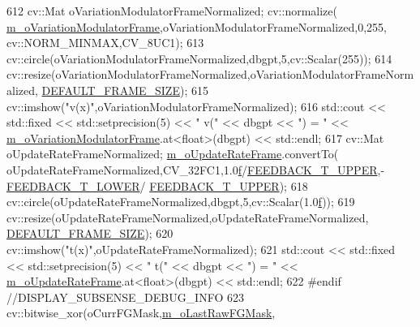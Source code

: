 \begin{DoxyCode}
612     cv::Mat oVariationModulatorFrameNormalized; cv::normalize(
      \mbox{\hyperlink{class_background_subtractor_su_b_s_e_n_s_e_a47d9cf067ac639d95fcb810c894bb770}{m\_oVariationModulatorFrame}},oVariationModulatorFrameNormalized,0,255,
      cv::NORM\_MINMAX,CV\_8UC1);
613     cv::circle(oVariationModulatorFrameNormalized,dbgpt,5,cv::Scalar(255));
614     cv::resize(oVariationModulatorFrameNormalized,oVariationModulatorFrameNormalized,
      \mbox{\hyperlink{_background_subtractor_su_b_s_e_n_s_e_8cpp_aee6405a4f74939fffcc9b3055af94b3a}{DEFAULT\_FRAME\_SIZE}});
615     cv::imshow(\textcolor{stringliteral}{"v(x)"},oVariationModulatorFrameNormalized);
616     std::cout << std::fixed << std::setprecision(5) << \textcolor{stringliteral}{"      v("} << dbgpt << \textcolor{stringliteral}{") = "} << 
      \mbox{\hyperlink{class_background_subtractor_su_b_s_e_n_s_e_a47d9cf067ac639d95fcb810c894bb770}{m\_oVariationModulatorFrame}}.at<\textcolor{keywordtype}{float}>(dbgpt) << std::endl;
617     cv::Mat oUpdateRateFrameNormalized; \mbox{\hyperlink{class_background_subtractor_su_b_s_e_n_s_e_a90cb2cc5cbe3f2f0b01e06f514c8b569}{m\_oUpdateRateFrame}}.convertTo(
      oUpdateRateFrameNormalized,CV\_32FC1,1.0\mbox{\hyperlink{rings_8cpp_a77369fc4d5326a16d2c603e032023528}{f}}/\mbox{\hyperlink{_background_subtractor_su_b_s_e_n_s_e_8cpp_a23bd980dc8c9bbffe3f27b44fa983f9c}{FEEDBACK\_T\_UPPER}},-\mbox{\hyperlink{_background_subtractor_su_b_s_e_n_s_e_8cpp_a6975332215c62c3172a76af852bc5566}{FEEDBACK\_T\_LOWER}}/
      \mbox{\hyperlink{_background_subtractor_su_b_s_e_n_s_e_8cpp_a23bd980dc8c9bbffe3f27b44fa983f9c}{FEEDBACK\_T\_UPPER}});
618     cv::circle(oUpdateRateFrameNormalized,dbgpt,5,cv::Scalar(1.0\mbox{\hyperlink{rings_8cpp_a77369fc4d5326a16d2c603e032023528}{f}}));
619     cv::resize(oUpdateRateFrameNormalized,oUpdateRateFrameNormalized,
      \mbox{\hyperlink{_background_subtractor_su_b_s_e_n_s_e_8cpp_aee6405a4f74939fffcc9b3055af94b3a}{DEFAULT\_FRAME\_SIZE}});
620     cv::imshow(\textcolor{stringliteral}{"t(x)"},oUpdateRateFrameNormalized);
621     std::cout << std::fixed << std::setprecision(5) << \textcolor{stringliteral}{"      t("} << dbgpt << \textcolor{stringliteral}{") = "} << 
      \mbox{\hyperlink{class_background_subtractor_su_b_s_e_n_s_e_a90cb2cc5cbe3f2f0b01e06f514c8b569}{m\_oUpdateRateFrame}}.at<\textcolor{keywordtype}{float}>(dbgpt) << std::endl;
622 \textcolor{preprocessor}{#endif //DISPLAY\_SUBSENSE\_DEBUG\_INFO}
623     cv::bitwise\_xor(oCurrFGMask,\mbox{\hyperlink{class_background_subtractor_su_b_s_e_n_s_e_a11c86236e9d141d711163c170a8bf0d6}{m\_oLastRawFGMask}},

\end{DoxyCode}
